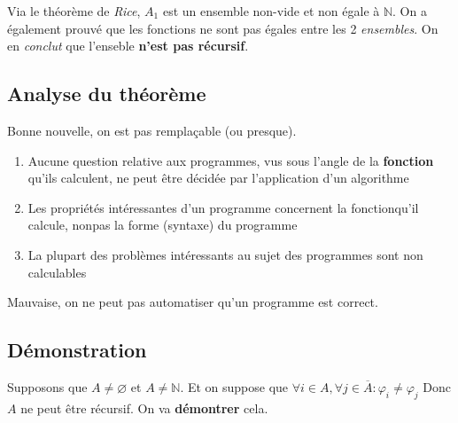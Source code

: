 \documentclass{report}
\begin{document}
Via le théorème de \textit{Rice}, $A_1$ est un ensemble non-vide et non égale à $\mathbb{N}$. On a également prouvé que les fonctions ne sont pas égales entre les 2 \textit{ensembles}. On en \textit{conclut} que l'enseble \textbf{n'est pas récursif}.

\subsection{Analyse du théorème}
Bonne nouvelle, on est pas remplaçable (ou presque).
\begin{enumerate}
\item Aucune question relative aux programmes, vus sous l’angle de la \textbf{fonction} qu’ils calculent, ne peut être décidée par l’application d’un algorithme
\item Les propriétés intéressantes d’un programme concernent la fonctionqu’il calcule, nonpas la forme (syntaxe) du programme
\item La plupart des problèmes intéressants au sujet des programmes sont non
calculables
\end{enumerate}
Mauvaise, on ne peut pas automatiser qu'un programme est correct.

\subsection{Démonstration}
Supposons que $A \neq \varnothing$ et $A \neq \mathbb{N}$. Et on suppose que $\forall i \in A, \forall j \in \overline{A}: \varphi_i \neq \varphi_j$ Donc $A$ ne peut être récursif. On va \textbf{démontrer} cela.\\
\end{document}
